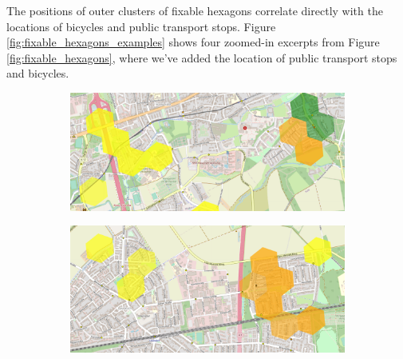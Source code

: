The positions of outer clusters of fixable hexagons correlate directly with the locations of bicycles and public transport stops.
Figure \ref{fig:fixable_hexagons_examples} shows four zoomed-in excerpts from Figure \ref{fig:fixable_hexagons}, where we've added the location of public transport stops and bicycles.
\begin{figure}
     \centering
     \begin{subfigure}[b]{0.45\textwidth}
         \centering
         \includegraphics[width=\textwidth]{Figures/results/problematic_hexagons/example_1.png}
     \end{subfigure}
     \hfill
     \begin{subfigure}[b]{0.45\textwidth}
         \centering
         \includegraphics[width=\textwidth]{Figures/results/problematic_hexagons/example_2.png}
     \end{subfigure}
     \hfill
     \begin{subfigure}[b]{0.45\textwidth}
         \centering

\end{subfigure}
\end{figure}
